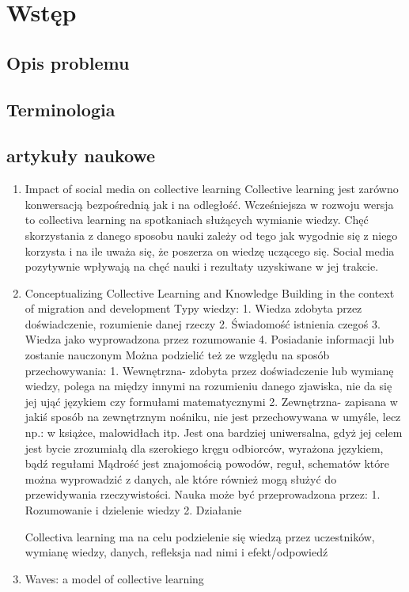 \documentclass[11pt]{aghdpl}
\author{Mateusz Grzeliński, Kornel Wilk, Mateusz Szymkowski}
\date{2018}
\begin{document}
\titlepages

{
        \fancyhf{}
        \renewcommand{\headrulewidth}{0pt}
        \renewcommand{\footrulewidth}{0pt}
}

\setcounter{tocdepth}{2}
\tableofcontents
\clearpage

\chapter{Wstęp}
\section{Opis problemu}

\section{Terminologia}

\section{artykuły naukowe}
\begin{enumerate}
\item Impact of social media on collective learning
Collective learning jest zarówno konwersacją bezpośrednią jak i na odległość.
Wcześniejsza w rozwoju wersja to collectiva learning na spotkaniach służących wymianie wiedzy. Chęć skorzystania z danego sposobu nauki zależy od tego jak wygodnie się z niego korzysta i na ile uważa się, że poszerza on wiedzę uczącego się.
Social media pozytywnie wpływają na chęć nauki i rezultaty uzyskiwane w jej trakcie.
\item Conceptualizing Collective Learning and Knowledge Building in the context of migration and development
Typy wiedzy:
1.	Wiedza zdobyta przez doświadczenie, rozumienie danej rzeczy
2.	Świadomość istnienia czegoś
3.	Wiedza jako wyprowadzona przez rozumowanie
4.	Posiadanie informacji lub zostanie nauczonym
Można podzielić też ze względu na sposób przechowywania:
1.	Wewnętrzna- zdobyta przez doświadczenie lub wymianę wiedzy, polega na między innymi na rozumieniu danego zjawiska, nie da się jej ująć językiem czy formułami matematycznymi
2.	Zewnętrzna- zapisana w jakiś sposób na zewnętrznym nośniku, nie jest przechowywana w umyśle, lecz np.: w książce, malowidłach itp. Jest ona bardziej uniwersalna, gdyż jej celem jest bycie zrozumiałą dla szerokiego kręgu odbiorców, wyrażona językiem, bądź regułami
Mądrość jest znajomością powodów, reguł, schematów które można wyprowadzić z danych, ale które również mogą służyć do przewidywania rzeczywistości.
Nauka może być przeprowadzona przez:
1.	Rozumowanie i dzielenie wiedzy
2.	Działanie

Collectiva learning ma na celu podzielenie się wiedzą przez uczestników, wymianę wiedzy, danych, refleksja nad nimi i efekt/odpowiedź
\item Waves: a model of collective learning

\end{enumerate}



% 
% 

\printbibliography
\end{document}
